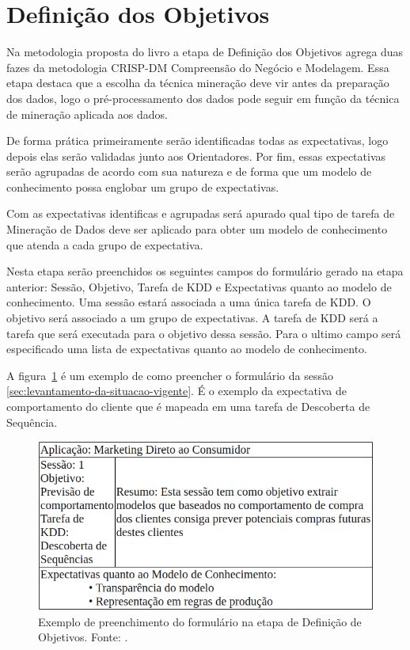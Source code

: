 \documentclass[diss-proposta,nocipinfo]{texufpel}
\begin{document}
\section{Definição dos Objetivos}
\label{sec:definicao-dos-objetivos}

Na metodologia proposta do livro a etapa de Definição dos Objetivos agrega duas fazes da metodologia CRISP-DM Compreensão do Negócio e Modelagem. Essa etapa destaca que a escolha da técnica mineração deve vir antes da preparação dos dados, logo o pré-processamento dos dados pode seguir em função da técnica de mineração aplicada aos dados.

De forma prática primeiramente serão identificadas todas as expectativas, logo depois elas serão validadas junto aos Orientadores. Por fim, essas expectativas serão agrupadas de acordo com sua natureza e de forma que um modelo de conhecimento possa englobar um grupo de expectativas.

Com as expectativas identificas e agrupadas será apurado qual tipo de tarefa de Mineração de Dados deve ser aplicado para obter um modelo de conhecimento que atenda a cada grupo de expectativa.

Nesta etapa serão preenchidos os seguintes campos do formulário gerado na etapa anterior: Sessão, Objetivo, Tarefa de KDD e Expectativas quanto ao modelo de conhecimento.
Uma sessão estará associada a uma única tarefa de KDD. O objetivo será associado a um grupo de expectativas. A tarefa de KDD será a tarefa que será executada para o objetivo dessa sessão. Para o ultimo campo será especificado uma lista de expectativas quanto ao modelo de conhecimento.

A figura~\ref{fig:formulario-etapa-definicao-objetivo} é um exemplo de como preencher o formulário da sessão \ref{sec:levantamento-da-situacao-vigente}. É o exemplo da expectativa de comportamento do cliente que é mapeada em uma tarefa de Descoberta de Sequência.

\begin{figure}[htbp]
  \centering \includegraphics[scale=.4]{imagens/formulario-etapa-definicao-objetivo.png}
  \caption{Exemplo de preenchimento do formulário na etapa de Definição de Objetivos. Fonte: \cite{goldschmidt2015data}.}
  \label{fig:formulario-etapa-definicao-objetivo}
\end{figure}
\end{document}

